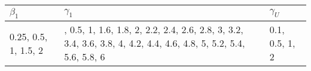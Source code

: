 
\begin{tabular}{l>{\raggedright\arraybackslash}p{1.5in}l}
\toprule
$\beta_1$ & $\gamma_1$ & $\gamma_U$\\
\midrule
0.25, 0.5, 1, 1.5, 2 & 0.25, 0.5, 1, 1.6, 1.8, 2, 2.2, 2.4, 2.6, 2.8, 3, 3.2, 3.4, 3.6, 3.8, 4, 4.2, 4.4, 4.6, 4.8, 5, 5.2, 5.4, 5.6, 5.8, 6 & 0.1, 0.5, 1, 2\\
\bottomrule
\end{tabular}